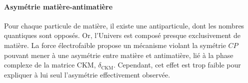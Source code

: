 \paragraph{Asymétrie matière-antimatière}
Pour chaque particule de matière, il existe une antiparticule, dont les nombres quantiques sont opposés.
Or, l'Univers est composé presque exclusivement de matière.
La force électrofaible propose un mécanisme violant la symétrie $CP$ pouvant mener à une asymétrie entre matière et antimatière, lié à la phase complexe de la matrice CKM, $\delta_{\text{CKM}}$.
Cependant, cet effet est trop faible pour expliquer à lui seul l'asymétrie effectivement observée.
